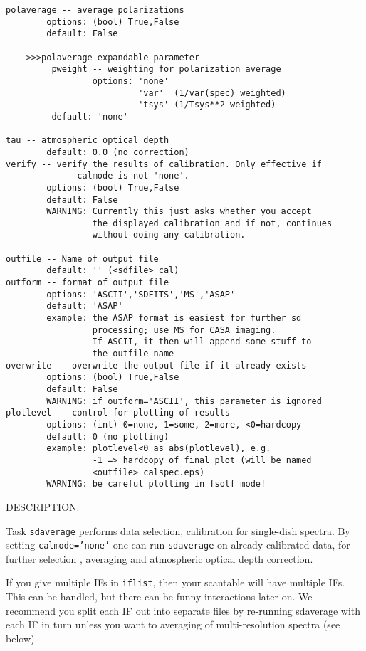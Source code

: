\begin{verbatim}
polaverage -- average polarizations
        options: (bool) True,False
        default: False
        
    >>>polaverage expandable parameter
         pweight -- weighting for polarization average
                 options: 'none'
                          'var'  (1/var(spec) weighted)
                          'tsys' (1/Tsys**2 weighted)
         default: 'none'
         
tau -- atmospheric optical depth
        default: 0.0 (no correction)
verify -- verify the results of calibration. Only effective if 
              calmode is not 'none'.
        options: (bool) True,False
        default: False
        WARNING: Currently this just asks whether you accept
                 the displayed calibration and if not, continues
                 without doing any calibration. 

outfile -- Name of output file
        default: '' (<sdfile>_cal)
outform -- format of output file
        options: 'ASCII','SDFITS','MS','ASAP'
        default: 'ASAP'
        example: the ASAP format is easiest for further sd
                 processing; use MS for CASA imaging.
                 If ASCII, it then will append some stuff to
                 the outfile name
overwrite -- overwrite the output file if it already exists
        options: (bool) True,False
        default: False
        WARNING: if outform='ASCII', this parameter is ignored
plotlevel -- control for plotting of results
        options: (int) 0=none, 1=some, 2=more, <0=hardcopy
        default: 0 (no plotting)
        example: plotlevel<0 as abs(plotlevel), e.g.
                 -1 => hardcopy of final plot (will be named
                 <outfile>_calspec.eps)
        WARNING: be careful plotting in fsotf mode!

\end{verbatim}

  DESCRIPTION:

  Task {\tt sdaverage} performs data selection, calibration for single-dish
  spectra.  By setting {\tt calmode='none'}
  one can run {\tt sdaverage} on already calibrated data, for further selection
  , averaging and atmospheric optical depth correction.

  If you give multiple IFs in {\tt iflist}, then your scantable will have
  multiple IFs.  This can be handled, but there can be funny interactions
  later on.  We recommend you split each IF out into separate files
  by re-running sdaverage with each IF in turn unless you want to averaging of
  multi-resolution spectra (see below).

